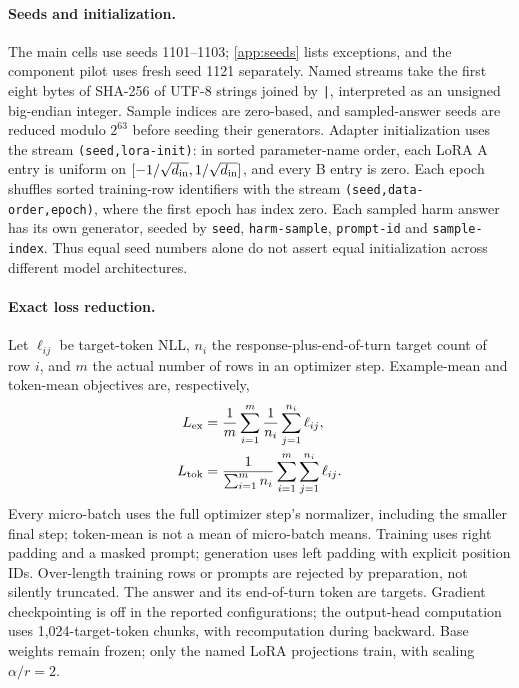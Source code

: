 \documentclass[11pt]{article}
\begin{document}
\paragraph{Seeds and initialization.} The main cells use seeds 1101--1103;
\cref{app:seeds} lists exceptions, and the component pilot uses fresh seed
1121 separately. Named streams take the first eight bytes of SHA-256 of
UTF-8 strings joined by \texttt{|}, interpreted as an unsigned big-endian
integer. Sample indices are zero-based, and sampled-answer seeds are reduced
modulo $2^{63}$ before seeding their generators. Adapter initialization uses the stream \texttt{(seed,lora-init)}:
in sorted parameter-name order, each LoRA A entry is uniform on
$[-1/\sqrt{d_{\rm in}},1/\sqrt{d_{\rm in}}]$, and every B entry is zero.
Each epoch shuffles sorted training-row identifiers with the stream
\texttt{(seed,data-order,epoch)}, where the first epoch has index zero.
Each sampled harm answer has its own generator, seeded by
\texttt{seed}, \texttt{harm-sample}, \texttt{prompt-id} and
\texttt{sample-index}. Thus equal seed numbers
alone do not assert equal initialization across different model architectures.

\paragraph{Exact loss reduction.} Let $\ell_{ij}$ be target-token NLL,
$n_i$ the response-plus-end-of-turn target count of row $i$, and $m$ the
actual number of rows in an optimizer step. Example-mean and token-mean
objectives are, respectively,
\begin{align}
 L_{\rm ex}&=\frac{1}{m}\sum_{i=1}^{m}
                  \frac{1}{n_i}\sum_{j=1}^{n_i}\ell_{ij},\\
 L_{\rm tok}&=\frac{1}{\sum_{i=1}^{m}n_i}
                  \sum_{i=1}^{m}\sum_{j=1}^{n_i}\ell_{ij}.
\end{align}
Every micro-batch uses the full optimizer step's normalizer, including the
smaller final step; token-mean is not a mean of micro-batch means. Training
uses right padding and a masked prompt; generation uses left padding with
explicit position IDs. Over-length training rows or prompts are rejected
by preparation, not silently truncated. The answer and its end-of-turn token
are targets. Gradient checkpointing is off in the reported configurations;
the output-head computation uses 1,024-target-token chunks, with recomputation
during backward. Base weights remain frozen; only the named LoRA projections
train, with scaling $\alpha/r=2$.
\end{document}
